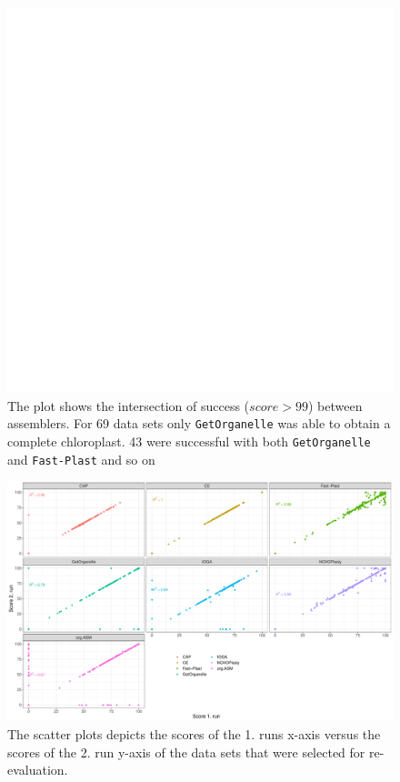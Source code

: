 \documentclass{bmcart}
\newcommand{\formatprogramnames}[1]{\texttt{#1}}
\newcommand{\fp}{\formatprogramnames{Fast-Plast}}
\newcommand{\go}{\formatprogramnames{GetOrganelle}}
\begin{document}
\begin{backmatter}
\begin{figure}[h!]
  \includegraphics[width=\textwidth,page=2]{upset.pdf}
  \caption{
      The plot shows the intersection of success ($score > 99$) between assemblers. For \num{69} data sets only \go{} was able to obtain a complete chloroplast. \num{43} were successful with both \go{} and \fp{} and so on}
            \label{fig:upset}
      \end{figure}

\begin{figure}[h!]
  \includegraphics[width=\textwidth]{repro.pdf}
  \caption{
  The scatter plots depicts the scores of the 1. runs x-axis versus the scores of the 2. run y-axis of the data sets that were selected for re-evaluation. 
      }
      \label{fig:consistency}
      \end{figure}


\end{backmatter}
\end{document}
